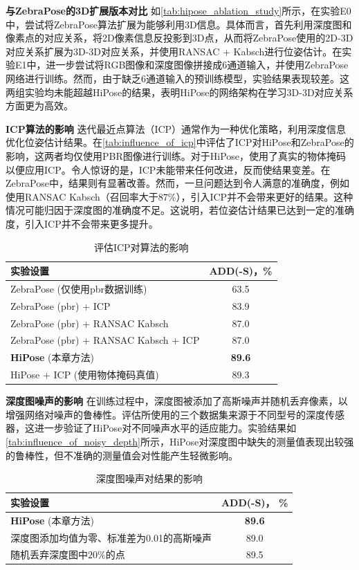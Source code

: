 \textbf{与ZebraPose的3D扩展版本对比 }
如\autoref{tab:hipose_ablation_study}所示，在实验E0中，尝试将ZebraPose算法扩展为能够利用3D信息。具体而言，首先利用深度图和像素点的对应关系，将2D像素信息反投影到3D点，从而将ZebraPose使用的2D-3D对应关系扩展为3D-3D对应关系，并使用RANSAC + Kabsch进行位姿估计。在实验E1中，进一步尝试将RGB图像和深度图像拼接成6通道输入，并使用ZebraPose网络进行训练。然而，由于缺乏6通道输入的预训练模型，实验结果表现较差。这两组实验均未能超越HiPose的结果，表明HiPose的网络架构在学习3D-3D对应关系方面更为高效。

\textbf{ICP算法的影响 }
迭代最近点算法（ICP）通常作为一种优化策略，利用深度信息优化位姿估计结果。在\autoref{tab:influence_of_icp}中评估了ICP对HiPose和ZebraPose的影响，这两者均仅使用PBR图像进行训练。对于HiPose，使用了真实的物体掩码以便应用ICP。令人惊讶的是，ICP未能带来任何改进，反而使结果变差。在ZebraPose中，结果则有显著改善。然而，一旦问题达到令人满意的准确度，例如使用RANSAC Kabsch（召回率大于$87\%$），引入ICP并不会带来更好的结果。这种情况可能归因于深度图的准确度不足。这说明，若位姿估计结果已达到一定的准确度，引入ICP并不会带来更多提升。

\begin{table}[h]
    \centering
    \caption{评估ICP对算法的影响}
    \label{tab:influence_of_icp}
    \begin{tabular}{@{}l|c@{}}
      \toprule
      实验设置 & ADD(-S)，\% \\
      \midrule
      ZebraPose (仅使用pbr数据训练) & 63.5\\
      ZebraPose (pbr) + ICP & 83.9\\
      ZebraPose (pbr) + RANSAC Kabsch & 87.0\\
      ZebraPose (pbr) + RANSAC Kabsch + ICP & 87.0\\
      \midrule
      \textbf{HiPose} (本章方法) &  \textbf{89.6}\\
      HiPose + ICP (使用物体掩码真值) &  89.3\\
      \bottomrule
    \end{tabular}
  \end{table}

\textbf{深度图噪声的影响 }
在训练过程中，深度图被添加了高斯噪声并随机丢弃像素，以增强网络对噪声的鲁棒性。评估所使用的三个数据集来源于不同型号的深度传感器，这进一步验证了HiPose对不同噪声水平的适应能力。实验结果如\autoref{tab:influence_of_noisy_depth}所示，HiPose对深度图中缺失的测量值表现出较强的鲁棒性，但不准确的测量值会对性能产生轻微影响。

\begin{table}[h]
    \centering
    \caption{深度图噪声对结果的影响}
    \label{tab:influence_of_noisy_depth}
        \begin{tabular}{@{}l|c@{}}
          \toprule
          实验设置 & ADD(-S)， \% \\
          \midrule
          \textbf{HiPose} (本章方法) &  \textbf{89.6}\\
          \midrule
          深度图添加均值为零、标准差为0.01的高斯噪声 & 89.0\\
          随机丢弃深度图中$20\%$的点 & 89.5 \\
          \bottomrule
        \end{tabular}
\end{table}

